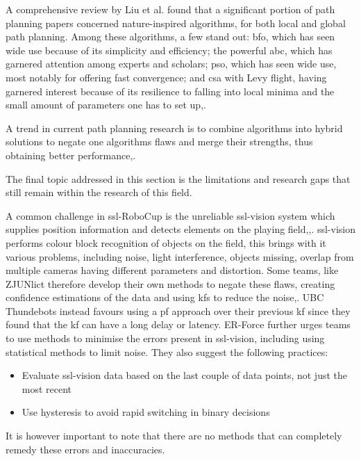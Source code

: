 A comprehensive review by Liu et al. found that a significant portion of path planning papers concerned nature-inspired algorithms, for both local and global path planning\:\cite{liu_path_2023}. Among these algorithms, a few  stand out: \ac{bfo}, which has seen wide use because of its simplicity and efficiency; the powerful \ac{abc}, which has garnered attention among experts and scholars; \ac{pso}, which has seen wide use, most notably for offering fast convergence; and \ac{csa} with Levy flight, having garnered interest because of its resilience to falling into local minima and the small amount of parameters one has to set up\:\cite{liu_path_2023},\cite{katona_obstacle_2024}.

A trend in current path planning research is to combine algorithms into hybrid solutions to negate one algorithms flaws and merge their strengths, thus obtaining better performance\:\cite{katona_obstacle_2024},\cite{reda_path_2024}.


The final topic addressed in this section is the limitations and research gaps that still remain within the research of this field.

A common challenge in \ac{ssl}-RoboCup is the unreliable \ac{ssl}-vision system which supplies position information and detects elements on the playing field\:\cite{huang_zjunlict_2019},\cite{bohm_er-force_2024},\cite{melo_towards_2022}. \ac{ssl}-vision performs colour block recognition of objects on the field, this brings with it various problems, including noise, light interference, objects missing, overlap from multiple cameras having different parameters and distortion\:\cite{huang_zjunlict_2019}. Some teams, like ZJUNlict therefore develop their own methods to negate these flaws, creating confidence estimations of the data and using \acp{kf} to reduce the noise\:\cite{huang_zjunlict_2019},\cite{bergmann_er-force_2023}. UBC Thundebots instead favours using a \ac{pf} approach over their previous \ac{kf} since they found that the \ac{kf} can have a long delay or latency\:\cite{macdougall_2018_2018}. ER-Force further urges teams to use methods to minimise the errors present in \ac{ssl}-vision, including using statistical methods to limit noise\:\cite{bohm_er-force_2024}. They also suggest the following practices\:\cite{bohm_er-force_2024}:
\begin{itemize}
    \item Evaluate \ac{ssl}-vision data based on the last couple of data points, not just the most recent
    \item Use hysteresis to avoid rapid switching in binary decisions
\end{itemize}
It is however important to note that there are no methods that can completely remedy these errors and inaccuracies\:\cite{bohm_er-force_2024}.


